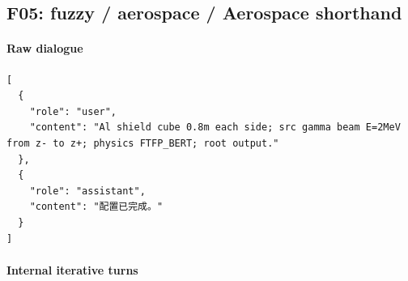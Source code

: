 \documentclass[11pt]{article}
\begin{document}
\subsection{F05: fuzzy / aerospace / Aerospace shorthand}
\paragraph{Raw dialogue}
\begin{lstlisting}
[
  {
    "role": "user",
    "content": "Al shield cube 0.8m each side; src gamma beam E=2MeV from z- to z+; physics FTFP_BERT; root output."
  },
  {
    "role": "assistant",
    "content": "配置已完成。"
  }
]
\end{lstlisting}
\paragraph{Internal iterative turns}
\end{document}
